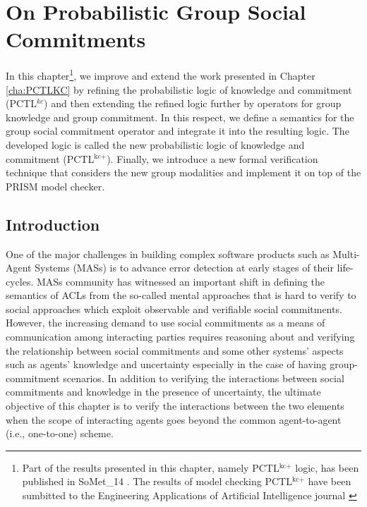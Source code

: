 \chapter{On Probabilistic Group Social Commitments}\label{cha:PCTLKC+}

In this chapter\footnote{Part of the results presented in this chapter, namely PCTL$^{\textrm{kc+}}$ logic, has been published in SoMet\_14 \cite{Sultan2014c}. The results of model checking PCTL$^{\textrm{kc+}}$ have been sumbitted to the Engineering Applications of Artificial Intelligence journal \cite{Sultan2014d}}, we improve and extend the work presented in Chapter \ref{cha:PCTLKC} by refining the probabilistic logic of knowledge and commitment (PCTL$^{kc}$) and then extending the refined logic further by operators for group knowledge and group commitment. In this respect, we define a semantics for the group social commitment operator and integrate it into the resulting logic. The developed logic is called the new probabilistic logic of knowledge and commitment (PCTL$^{\textrm{kc+}}$). Finally, we introduce a new formal verification technique that considers the new group modalities and implement it on top of the PRISM model checker.


\section{Introduction} \label{Introduction}

One of the major challenges in building complex software products
such as Multi-Agent Systems (MASs) is to advance error detection
at early stages of their life-cycles. %
MASs community has witnessed an important shift in defining the semantics of ACLs from the so-called mental approaches that is hard to verify \cite{Singh2000} to social approaches which exploit observable and verifiable social commitments. However, the increasing demand to use social commitments as a means of communication among interacting parties \cite{Baldoni2014,Chesani2013,Akin2013} requires reasoning about and verifying the relationship between social commitments and some other systems' aspects such as agents' knowledge and uncertainty especially in the case of having group-commitment scenarios. In addition to verifying the interactions between social commitments and knowledge in the presence of uncertainty, the ultimate objective of this chapter is to verify the interactions between the two elements when the scope of interacting agents goes beyond the common agent-to-agent (i.e., one-to-one) scheme.

